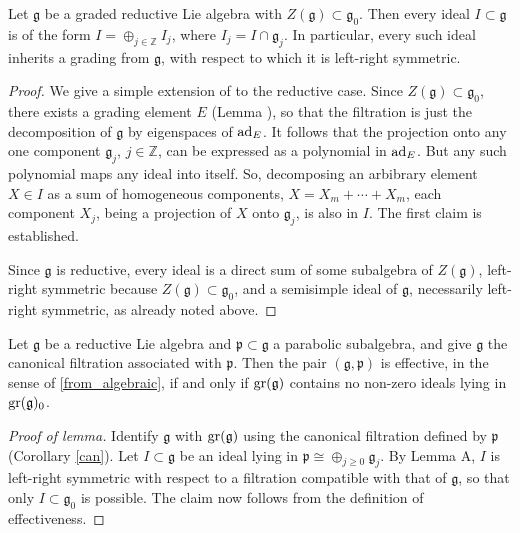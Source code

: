 \documentclass[leqno,12pt]{amsart} %
\begin{document}
\begin{lemmaA}
  Let ${\mathfrak g} $ be a graded reductive Lie algebra with
  $Z({\mathfrak g}) \subset {\mathfrak g}_0$. Then every ideal $I \subset {\mathfrak g} $
  is of the form $I = \oplus_{j \in {\mathbb Z}} I_j$, where $I_j=I \cap {\mathfrak
    g}_j$. In particular, every such ideal inherits a grading from ${\mathfrak g} $, with
  respect to which it is left-right symmetric.
\end{lemmaA}

\begin{proof}
  We give a simple extension of \cite[Proposition 3.1.2(2), p.~214]{Cap_Slovak_09} to the
  reductive case. Since $Z({\mathfrak g}) \subset {\mathfrak g}_0$, there exists a grading
  element $E$ (Lemma ), so that the filtration is just the decomposition
  of ${\mathfrak g} $ by eigenspaces of $\operatorname{ad}_E$. It follows that the projection onto
  any one component ${\mathfrak g}_j$, $j \in {\mathbb Z}$, can be expressed as a
  polynomial in $\operatorname{ad}_E$. But any such polynomial maps any ideal into itself. So,
  decomposing an arbibrary element $X \in I$ as a sum of homogeneous components,
  $X = X_m + \cdots + X_m$, each component $X_j$, being a projection of $X$ onto
  ${\mathfrak g}_j$, is also in $I$. The first claim is established.

  Since ${\mathfrak g} $ is reductive, every ideal is a direct sum of some subalgebra of
  $Z({\mathfrak g})$, left-right symmetric because
  $Z({\mathfrak g}) \subset {\mathfrak g}_0$, and a semisimple ideal of ${\mathfrak g} $,
  necessarily left-right symmetric, as already noted above.
\end{proof}

\begin{lemmaB}
  Let ${\mathfrak g} $ be a reductive Lie algebra and
  ${\mathfrak p} \subset {\mathfrak g} $ a parabolic subalgebra, and give ${\mathfrak g} $
  the canonical filtration associated with ${\mathfrak p} $. Then the pair
  $({\mathfrak g}, {\mathfrak p})$ is effective, in the sense of \ref{from_algebraic}, if
  and only if $\operatorname{\operatorname{gr}}({\mathfrak g})$ contains no non-zero ideals lying in
  $\operatorname{\operatorname{gr}}({\mathfrak g})_0$.
\end{lemmaB}

\begin{proof}[Proof of lemma]
  Identify ${\mathfrak g}$ with $\operatorname{\operatorname{gr}}({\mathfrak g})$ using the canonical filtration
  defined by ${\mathfrak p}$ (Corollary \ref{can}). Let $I \subset {\mathfrak g} $ be an
  ideal lying in ${\mathfrak p}\cong \oplus_{j\ge 0} {\mathfrak g}_j$. By Lemma A, $I$ is
  left-right symmetric with respect to a filtration compatible with that of
  ${\mathfrak g} $, so that only $I \subset {\mathfrak g}_0$ is possible. The claim now
  follows from the definition of effectiveness.
\end{proof}
\end{document}

